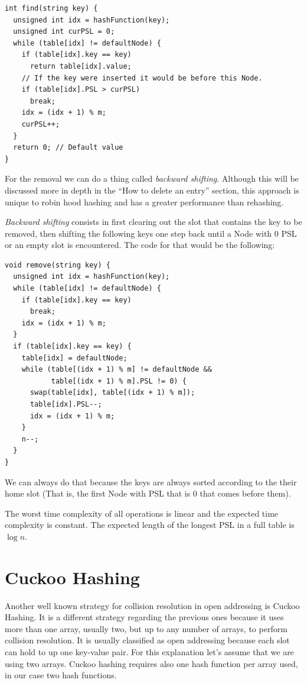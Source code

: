 \newpage

\begin{lstlisting}
int find(string key) {
  unsigned int idx = hashFunction(key);
  unsigned int curPSL = 0;
  while (table[idx] != defaultNode) {
    if (table[idx].key == key) 
      return table[idx].value;
    // If the key were inserted it would be before this Node.
    if (table[idx].PSL > curPSL)
      break; 
    idx = (idx + 1) % m;
    curPSL++;
  }
  return 0; // Default value
}
\end{lstlisting}

For the removal we can do a thing called \textit{backward shifting}. Although this will be discussed more in depth in the ``How to delete an entry'' section, this approach is unique to robin hood hashing and has a greater performance than rehashing.

\textit{Backward shifting} consists in first clearing out the slot that contains the key to be removed, then shifting the following keys one step back until a Node with 0 PSL or an empty slot is encountered. The code for that would be the following:

\begin{lstlisting}
void remove(string key) {
  unsigned int idx = hashFunction(key);
  while (table[idx] != defaultNode) {
    if (table[idx].key == key) 
      break;
    idx = (idx + 1) % m;
  }
  if (table[idx].key == key) {
    table[idx] = defaultNode;
    while (table[(idx + 1) % m] != defaultNode &&
           table[(idx + 1) % m].PSL != 0) {
      swap(table[idx], table[(idx + 1) % m]);
      table[idx].PSL--;
      idx = (idx + 1) % m;
    }
    n--;
  }
}
\end{lstlisting}

We can always do that because the keys are always sorted according to the their home slot (That is, the first Node with PSL that is 0 that comes before them).

The worst time complexity of all operations is linear and the expected time complexity is constant. The expected length of the longest PSL in a full table is \( \log n \).
\section{Cuckoo Hashing}

Another well known strategy for collision resolution in open addressing is Cuckoo Hashing. It is a different strategy regarding the previous ones because it uses more than one array, usually two, but up to any number of arrays, to perform collision resolution. It is usually classified as open addressing because each slot can hold to up one key-value pair. For this explanation let's assume that we are using two arrays. Cuckoo hashing requires also one hash function per array used, in our case two hash functions.

